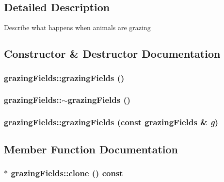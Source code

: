 \subsection{Detailed Description}
Describe what happens when animals are grazing 

\subsection{Constructor \& Destructor Documentation}
\hypertarget{classgrazing_fields_acdb3d6a1c95e24d586c272e4f4822a16}{
\subsubsection[{grazingFields}]{\setlength{\rightskip}{0pt plus 5cm}grazingFields::grazingFields ()}}
\label{classgrazing_fields_acdb3d6a1c95e24d586c272e4f4822a16}
\hypertarget{classgrazing_fields_a04d458777a15183181d8abc32778bf06}{
\subsubsection[{$\sim$grazingFields}]{\setlength{\rightskip}{0pt plus 5cm}grazingFields::$\sim$grazingFields ()}}
\label{classgrazing_fields_a04d458777a15183181d8abc32778bf06}
\hypertarget{classgrazing_fields_ae1390c8af68f4316a5d26798ab706407}{
\subsubsection[{grazingFields}]{\setlength{\rightskip}{0pt plus 5cm}grazingFields::grazingFields (const {\bf grazingFields} \& {\em g})}}
\label{classgrazing_fields_ae1390c8af68f4316a5d26798ab706407}


\subsection{Member Function Documentation}
\hypertarget{classgrazing_fields_a512df2449aac5ed1621dd4c543857712}{
\subsubsection[{clone}]{ $\ast$ grazingFields::clone () const}}
\label{classgrazing_fields_a512df2449aac5ed1621dd4c543857712}



